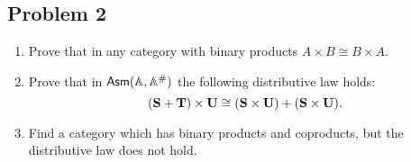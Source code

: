 \documentclass[a4paper,11pt]{article}
\begin{document}
\subsection*{Problem 2}

\begin{enumerate}
\item Prove that in any category with binary products $A \times B
  \cong B \times A$.
\item 
  Prove that in $\mathsf{Asm}(\mathbb{A},\mathbb{A}^{\#})$ the following distributive law holds:
  \begin{equation*}
    (\mathbf{S} + \mathbf{T}) \times \mathbf{U} \cong
    (\mathbf{S} \times \mathbf{U}) + (\mathbf{S} \times \mathbf{U}).
  \end{equation*}
\item Find a category which has binary products and coproducts, but
  the distributive law does not hold.
\end{enumerate}
\end{document}
